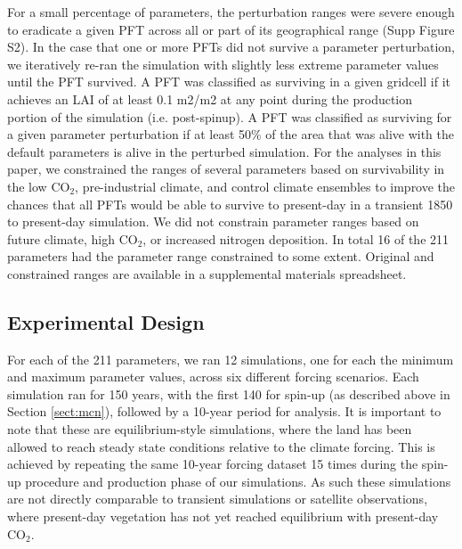 \documentclass[draft]{agujournal2019}
\begin{document}
For a small percentage of parameters, the perturbation ranges were severe enough to eradicate a given PFT across all or part of its geographical range (Supp Figure S2). 
In the case that one or more PFTs did not survive a parameter perturbation, we iteratively re-ran the simulation with slightly less extreme parameter values until the PFT survived.
A PFT was classified as surviving in a given gridcell if it achieves an LAI of at least 0.1 m2/m2 at any point during the production portion of the simulation (i.e. post-spinup).
A PFT was classified as surviving for a given parameter perturbation if at least 50\% of the area that
was alive with the default parameters is alive in the perturbed simulation.
For the analyses in this paper, we constrained the ranges of several parameters based on survivability in the low CO$_2$, pre-industrial climate, and control climate ensembles to improve the chances that all PFTs would be able to survive to present-day in a transient 1850 to present-day simulation.
We did not constrain parameter ranges based on future climate, high CO$_2
$, or increased nitrogen deposition.
In total 16 of the 211 parameters had the parameter range constrained to some extent. Original and constrained ranges are available in a supplemental materials spreadsheet.

\subsection{Experimental Design}
\label{sect:exp}
For each of the 211 parameters, we ran 12 simulations, one for each the minimum and maximum parameter values, across six different forcing scenarios.
Each simulation ran for 150 years, with the first 140 for spin-up (as described above in Section \ref{sect:mcn}), followed by a 10-year period for analysis.
It is important to note that these are equilibrium-style simulations, where the land has been allowed to reach steady state conditions relative to the climate forcing. This is achieved by repeating the same 10-year forcing dataset 15 times during the spin-up procedure and production phase of our simulations. As such these simulations are not directly comparable to transient simulations or satellite observations, where present-day vegetation has not yet reached equilibrium with present-day CO$_2$.
\end{document}
